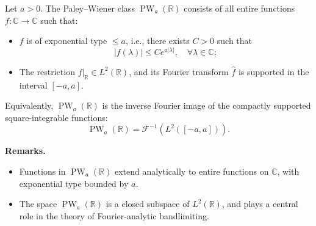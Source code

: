 \begin{definition}
\label{def:paley_wiener_class}
Let \( a > 0 \). The Paley--Wiener class \( \operatorname{PW}_a(\mathbb{R}) \) consists of all entire functions \( f \colon \mathbb{C} \to \mathbb{C} \) such that:
\begin{itemize}
  \item \( f \) is of exponential type \( \le a \), i.e., there exists \( C > 0 \) such that
  \[
  |f(\lambda)| \le C e^{a |\lambda|}, \quad \forall \lambda \in \mathbb{C};
  \]
  \item The restriction \( f|_{\mathbb{R}} \in L^2(\mathbb{R}) \), and its Fourier transform \( \widehat{f} \) is supported in the interval \( [-a, a] \).
\end{itemize}

\medskip
\noindent
Equivalently, \( \operatorname{PW}_a(\mathbb{R}) \) is the inverse Fourier image of the compactly supported square-integrable functions:
\[
\operatorname{PW}_a(\mathbb{R}) = \mathcal{F}^{-1}(L^2([-a, a])).
\]

\medskip
\noindent\textbf{Remarks.}
\begin{itemize}
  \item Functions in \( \operatorname{PW}_a(\mathbb{R}) \) extend analytically to entire functions on \( \mathbb{C} \), with exponential type bounded by \( a \).
  \item The space \( \operatorname{PW}_a(\mathbb{R}) \) is a closed subspace of \( L^2(\mathbb{R}) \), and plays a central role in the theory of Fourier-analytic bandlimiting.
\end{itemize}
\end{definition}
